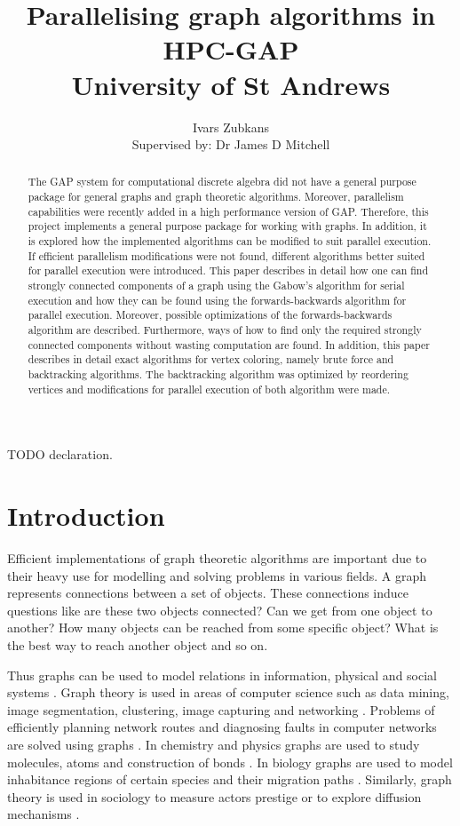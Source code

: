 \documentclass{report}
\title{Parallelising graph algorithms in HPC-GAP \\ \vspace{2 mm} {\large University of St Andrews}}
\author{Ivars Zubkans \\ \small Supervised by: Dr James D Mitchell}
\theoremstyle{plain}
\theoremstyle{definition}
\theoremstyle{remark}
\numberwithin{definition}{chapter}
\numberwithin{example}{chapter}
\numberwithin{figure}{chapter}
\numberwithin{theorem}{chapter}
\numberwithin{lemma}{chapter}
\begin{document}
\maketitle

\begin{abstract}

The GAP system for computational discrete algebra did not have a general purpose package for general graphs and graph theoretic algorithms. Moreover, parallelism capabilities were recently added in a high performance version of GAP. Therefore, this project implements a general purpose package for working with graphs. In addition, it is explored how the implemented algorithms can be modified to suit parallel execution. If efficient parallelism modifications were not found, different algorithms better suited for parallel execution were introduced. This paper describes in detail how one can find strongly connected components of a graph using the Gabow's algorithm for serial execution and how they can be found using the forwards-backwards algorithm for parallel execution. Moreover, possible optimizations of the forwards-backwards algorithm are described. Furthermore, ways of how to find only the required strongly connected components without wasting computation are found. In addition, this paper describes in detail exact algorithms for vertex coloring, namely brute force and backtracking algorithms. The backtracking algorithm was optimized by reordering vertices and modifications for parallel execution of both algorithm were made.

\end{abstract}

TODO declaration.

\tableofcontents

\chapter{Introduction}

Efficient implementations of graph theoretic algorithms are important due to their heavy use for modelling and solving problems in various fields. A graph represents connections between a set of objects. These connections induce questions like are these two objects connected? Can we get from one object to another? How many objects can be reached from some specific object? What is the best way to reach another object and so on.

Thus graphs can be used to model relations in information, physical and social systems \cite{6005872}. Graph theory is used in areas of computer science such as data mining, image segmentation, clustering, image capturing and networking \cite{6005872}. Problems of efficiently planning network routes and diagnosing faults in computer networks are solved using graphs \cite{6005872}. In chemistry and physics graphs are used to study molecules, atoms and construction of bonds \cite{shirinivas2010applications}. In biology graphs are used to model inhabitance regions of certain species and their migration paths \cite{shirinivas2010applications}. Similarly, graph theory is used in sociology to measure actors prestige or to explore diffusion mechanisms \cite{shirinivas2010applications}.
\end{document}
